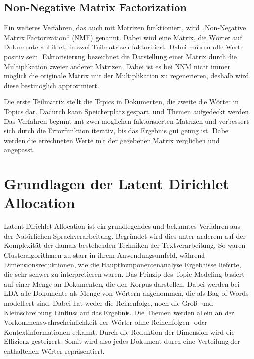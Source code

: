 \documentclass[german,version-2020-11]{uzl-thesis}
\begin{document}
\subsection{Non-Negative Matrix Factorization}
Ein weiteres Verfahren, das auch mit Matrizen funktioniert, wird „Non-Negative Matrix Factorization“ (NMF) genannt. Dabei wird eine Matrix, die Wörter auf Dokumente abbildet, in zwei Teilmatrizen faktorisiert. Dabei müssen alle Werte positiv sein. Faktorisierung bezeichnet die Darstellung einer Matrix durch die Multiplikation zweier anderer Matrizen. Dabei ist es bei NNM nicht immer möglich die originale Matrix mit der Multiplikation zu regenerieren, deshalb wird diese bestmöglich approximiert. 

Die erste Teilmatrix stellt die Topics in Dokumenten, die zweite die Wörter in Topics dar. Dadurch kann Speicherplatz gespart, und Themen aufgedeckt werden. Das Verfahren beginnt mit zwei möglichen faktorisierten Matrizen und verbessert sich durch die Errorfunktion iterativ, bis das Ergebnis gut genug ist. Dabei werden die errechneten Werte mit der gegebenen Matrix verglichen und angepasst.


\section{Grundlagen der Latent Dirichlet Allocation }
Latent Dirichlet Allocation ist ein grundlegendes und bekanntes Verfahren aus der Natürlichen Sprachverarbeitung. Begründet wird dies unter anderem auf der Komplexität der damals bestehenden Techniken der Textverarbeitung. So waren Clusteralgorithmen zu starr in ihrem Anwendungsumfeld, während Dimensionsreduktionen, wie die Hauptkomponentenanalyse Ergebnisse lieferte, die sehr schwer zu interpretieren waren. Das Prinzip des Topic Modeling basiert auf einer Menge an Dokumenten, die den Korpus darstellen. Dabei werden bei LDA alle Dokumente als Menge von Wörtern angenommen, die als Bag of Words modelliert sind. Dabei hat weder die Reihenfolge, noch die Groß- und Kleinschreibung Einfluss auf das Ergebnis. Die Themen werden  allein an der Vorkommenswahrscheinlichkeit der Wörter ohne Reihenfolgen- oder Kontextinformationen erkannt. Durch die Reduktion der Dimension wird die Effizienz gesteigert. Somit wird also jedes Dokument durch eine Verteilung der enthaltenen Wörter repräsentiert.\\
\end{document}
